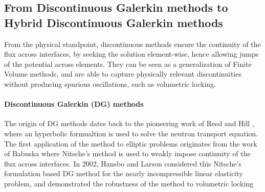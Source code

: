 
\subsection{From Discontinuous Galerkin methods to Hybrid Discontinuous Galerkin methods}

From the physical standpoint, discontinuous methods ensure the continuity of the flux
across interfaces, by seeking the solution element-wise, hence allowing
jumps of the potential across elements. They can be seen as a
generalization of Finite Volume methods, and are able to capture
physically relevant discontinuities without producing spurious
oscillations, such as volumetric locking.

\paragraph{Discontinuous Galerkin (DG) methods}

The origin of DG methods dates back to the pioneering work of Reed and Hill
\cite{reed_triangular_1973}, where an hyperbolic formualtion is used to
solve the neutron transport equation. The first application of the
method to elliptic problems originates from the work of Babuska \cite{babuska_finite_1973}
where Nitsche's method \cite{nitsche_uber_1970} is used to weakly impose
continuity of the flux across interfaces.
In 2002, Hansbo and Larson \cite{hansbo_discontinuous_2002-1} considered this
Nitsche's formulation based DG
method for the nearly incompressible linear
elasticity problem, and demonstrated the robustness of the method to volumetric locking 


